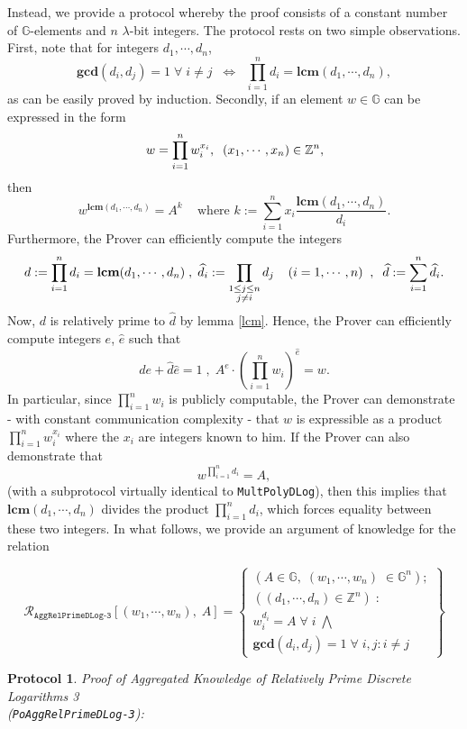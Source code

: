 \documentclass[11pt, lettersize, notitlepage, leqno, footskip=0.6cm]{article}
\newcommand{\bz}{\mathbb Z}
\newcommand{\pl}{\prod\limits}
\newcommand{\slim}{\sum\limits}
\newcommand{\ttt}{\texttt}
\newcommand{\LRA}{\Longleftrightarrow}
\newcommand{\mc}{\mathcal}
\newcommand{\mb}{\mathbb}
\newcommand{\mbf}{\mathbf}
\newcommand{\lam}{\lambda}
\newcommand{\what}{\widehat}
\newcommand{\vs}{\vspace{-0.15cm}}
\newcommand{\LCM}{\mbf{lcm}}
\newcommand{\GCD}{\mbf{gcd}}
\newtheorem{Prot}[Thm]{Protocol}
\numberwithin{equation}{section}
\begin{document}
Instead, we provide a protocol whereby the proof consists of a constant number of $\mb{G}$-elements and $n$ $\lam$-bit integers. The protocol rests on two simple observations. First, note that for integers $d_1,\cdots,d_n$, \vs $$\GCD(d_i,d_j)=1\;\forall\;i\neq j\;\; \LRA\;\; \pl_{i=1}^n d_i= \LCM(d_1,\cdots,d_n),$$ as can be easily proved by induction. Secondly, if an element $w\in \mb{G}$ can be expressed in the form \vs $$w = \prod\limits_{i=1}^n w_i^{x_i},\;\;(x_1,\cdots,x_n)\in\bz^n, \vs$$ then \vs $$w^{\LCM(d_1,\cdots,d_n)} = A^{k} \;\;\;\text{ where } k := \slim_{i=1}^n x_i\frac{\LCM(d_1,\cdots,d_n)}{d_i}.$$ Furthermore, the Prover can efficiently compute the integers \vs $$d:= \pl_{i=1}^n d_i = \LCM(d_1,\cdots,d_n)\;,\;\what{d}_i:= \pl_{\substack{1\leq j\leq n\\ j\neq i}} d_j\;\;\;\; (i=1,\cdots,n)\;\;,\;\; \what{d} := \slim_{i=1}^n \what{d}_i. \vs $$ Now, $d$ is relatively prime to $\what{d}$ by lemma \ref{lcm}. Hence, the Prover can efficiently compute integers $e$, $\what{e}$ such that \vs $$de+\what{d}\what{e} = 1\;,\; A^e \cdot (\pl_{i=1}^n w_i)^{\what{e}} = w.  $$ In particular, since $\prod_{i=1}^n w_i$ is publicly computable, the Prover can demonstrate - with constant communication complexity - that $w$ is expressible as a product $\prod_{i=1}^n w_i^{x_i}$ where the $x_i$ are integers known to him. If the Prover can also demonstrate that \vs $$w^{\prod\limits_{i=1}^n d_i} = A,$$ (with a subprotocol virtually identical to \verb|MultPolyDLog|), then this implies that $\LCM(d_1,\cdots,d_n)$ divides the product $\prod_{i=1}^n d_i$, which forces equality between these two integers. In what follows, we provide an argument of knowledge for the relation  

\[
  \mc{R}_{\ttt{AggRelPrimeDLog-3}}[(w_1,\cdots, w_n),\; A] = \left\{\begin{array}{l}
    (A\in\mb{G},\; (w_1,\cdots, w_n)\;\in\mb{G}^n);\\
    ((d_1,\cdots,d_n)\in\bz^n)\;: \\
    w_i^{d_i} = A\;\forall\; i\;\bigwedge\\
   	\GCD(d_i, d_j) = 1\;\forall \;i,j: i\neq j
  \end{array}\right\}
\] 

\vspace{0.1cm}



\begin{Prot} \normalfont \hypertarget{RP3}{\textit{Proof of Aggregated Knowledge of Relatively Prime Discrete Logarithms} 3}\\ (\verb|PoAggRelPrimeDLog-3|):\end{Prot} \vspace{-0.3cm}
\end{document}

